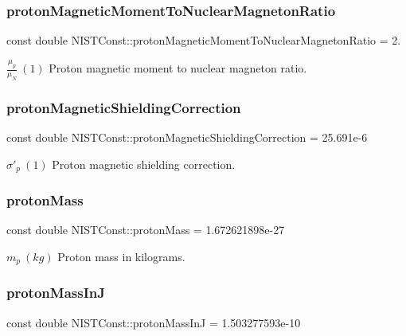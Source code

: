 \subsubsection{\texorpdfstring{proton\+Magnetic\+Moment\+To\+Nuclear\+Magneton\+Ratio}{protonMagneticMomentToNuclearMagnetonRatio}}
{\footnotesize\ttfamily const double N\+I\+S\+T\+Const\+::proton\+Magnetic\+Moment\+To\+Nuclear\+Magneton\+Ratio = 2.}

$\frac{\mu_p}{\mu_N} \ (1)$ Proton magnetic moment to nuclear magneton ratio. \mbox{\label{group___proton_ga401cef12f93ba64cca44703bbdb516e7}} 
\subsubsection{\texorpdfstring{proton\+Magnetic\+Shielding\+Correction}{protonMagneticShieldingCorrection}}
{\footnotesize\ttfamily const double N\+I\+S\+T\+Const\+::proton\+Magnetic\+Shielding\+Correction = 25.\+691e-\/6}

$\sigma'_p \ (1)$ Proton magnetic shielding correction. \mbox{\label{group___proton_gaa6738785a6bf04323231318dd6b2ed90}} 
\subsubsection{\texorpdfstring{proton\+Mass}{protonMass}}
{\footnotesize\ttfamily const double N\+I\+S\+T\+Const\+::proton\+Mass = 1.\+672621898e-\/27}

$m_p \ (kg)$ Proton mass in kilograms. \mbox{\label{group___proton_ga72cd86bc08ccb88687e8670d9efb378a}} 
\subsubsection{\texorpdfstring{proton\+Mass\+InJ}{protonMassInJ}}
{\footnotesize\ttfamily const double N\+I\+S\+T\+Const\+::proton\+Mass\+InJ = 1.\+503277593e-\/10}

